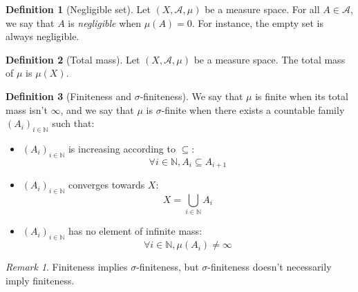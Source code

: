 \documentclass{article}
\theoremstyle{definition}
\newtheorem{definition}{Definition}[section]
\theoremstyle{remark}
\newtheorem*{remark}{Remark}
\theoremstyle{example}
\begin{document}
\begin{definition}[Negligible set]
    Let $(X, \mathcal{A}, \mu)$ be a measure space. For all $A \in \mathcal{A}$, we say that $A$ is \textit{negligible} when $\mu(A) = 0$. For instance, the empty set is always negligible.
\end{definition}

\begin{definition}[Total mass]
    Let $(X, \mathcal{A}, \mu)$ be a measure space. The total mass of $\mu$ is $\mu(X)$.
\end{definition}

\begin{definition}[Finiteness and $\sigma$-finiteness]
    We say that $\mu$ is finite when its total mass isn't $\infty$, and we say that $\mu$ is $\sigma$-finite when there exists a countable family $(A_i)_{i \in \mathbb{N}}$ such that:
    \begin{itemize}
        \item $(A_i)_{i \in \mathbb{N}}$ is increasing according to $\subseteq$:
            $$\forall i \in \mathbb{N}, A_i \subseteq A_{i+1}$$
        \item $(A_i)_{i \in \mathbb{N}}$ converges towards $X$:
            $$X = \bigcup_{i \in \mathbb{N}} A_i$$
        \item $(A_i)_{i \in \mathbb{N}}$ has no element of infinite mass:
            $$\forall i \in \mathbb{N}, \mu(A_i) \neq \infty$$
    \end{itemize}
\end{definition}

\begin{remark}
    Finiteness implies $\sigma$-finiteness, but $\sigma$-finiteness doesn't necessarily imply finiteness.
\end{remark}
\end{document}
